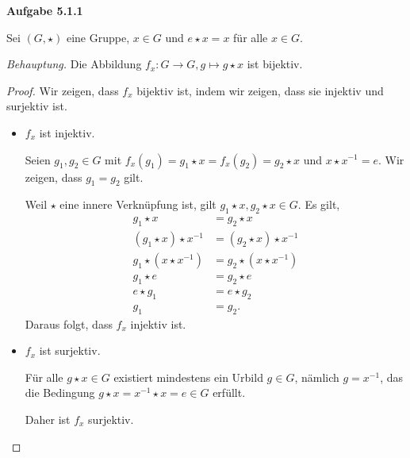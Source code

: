 \documentclass[12pt]{extarticle}
\begin{document}
\textbf{Aufgabe 5.1.1}

Sei \((G, \star)\) eine Gruppe, \(x \in G\) und \(e \star x = x\) für alle
\(x \in G\).

\vspace{3mm}
\textit{Behauptung.}  Die Abbildung $f_x: G \rightarrow G, g \mapsto g
\star x$ ist bijektiv.

\begin{proof}

  Wir zeigen, dass \(f_x\) bijektiv ist, indem wir zeigen, dass sie
  injektiv und surjektiv ist.
  \begin{itemize}
  \item \(f_x\) ist injektiv.

    Seien \(g_1, g_2 \in G\) mit \(f_x(g_1) = g_1 \star x = f_x(g_2) = g_2 \star x\) und
    \(x \star x^{-1} = e\).  Wir zeigen, dass \(g_1 = g_2\) gilt.

    Weil \(\star\) eine innere Verknüpfung ist, gilt $g_1 \star x, g_2
    \star x \in G$.  Es gilt,
\begin{align*}
  g_1 \star x &= g_2 \star x \\
  (g_1 \star x) \star x^{-1} &= (g_2 \star x) \star x^{-1} \\
  g_1 \star (x \star x^{-1}) &= g_2 \star (x \star x^{-1})
                               \tag*{Assoziativgesetz von Gruppen}\\
  g_1 \star e &= g_2 \star e \\
  e \star g_1 &= e \star g_2
                \tag*{Lecture Notes Satz 3.4.i}\\
  g_1 &= g_2.
\end{align*}
Daraus folgt, dass \(f_x\) injektiv ist.
\item  \(f_x\) ist surjektiv.

  Für alle \(g \star x \in G\) existiert mindestens ein Urbild
  \(g \in G\), nämlich \(g = x^{-1}\), das die Bedingung $g \star x =
  x^{-1} \star x = e \in G$ erfüllt.

  Daher ist \(f_x\) surjektiv.
\end{itemize}
\end{proof}
\end{document}

